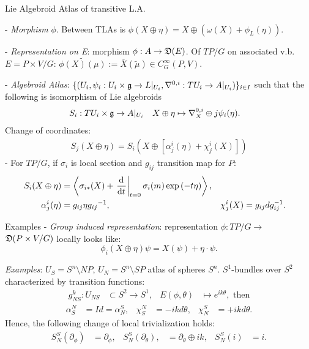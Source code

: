 \begin{frame}{Lie Algebroid Atlas of transitive L.A.}
    
    - \emph{Morphism} $\phi$. Between TLAs is $\phi(X \oplus \eta) = X \oplus (\omega(X) + \phi_L(\eta))$.
    
    - \emph{Representation on E}: morphism $\phi: A \to \alg D(E)$.
    Of $TP/G$ on associated v.b. $E = P \times V / G$: $\tilde{\phi(X)( \mu)}:= \overline{X}(\tilde{ \mu}) \in C^\infty_G(P, V).$
    
    - \emph{Algebroid Atlas}: $\{(U_i, \psi_i: U_i \times \mathfrak{g} \to L|_{U_i}, \nabla^{0, i}: TU_i \to A|_{U_i})\}_{i \in I}$ such that the following is isomorphism of Lie algebroids
    \begin{align}
        S_i: TU_i \times \mathfrak{g} &\to A|_{U_i} & X \oplus \eta &\mapsto \nabla^{0,i}_X \oplus j \psi_i(\eta).
    \end{align}
    Change of coordinates:
    \begin{align}
        S_j(X \oplus \eta) = S_i(X \oplus [\alpha^i_j(\eta) + \chi^i_j(X)])
    \end{align}
    - For $TP/G$, if $\sigma_i$ is local section and $g_{ij}$ transition map for $P$:
    \begin{align*}
        S_i(X \oplus \eta)&= \cl{\sigma_{i*}(X) + \der{t}[t = 0]\sigma_i(m) \exp{(-t \eta)}},\\
         \alpha^i_j(\eta) &= g_{ij} \eta {g_{ij}}^{-1},&
         \chi^i_j(X) &= g_{ij} dg^{-1}_{ij}.
    \end{align*}
    
\end{frame}




\begin{frame}{Examples}
    - \emph{Group induced representation}: representation $\phi:TP/G \to $ $\mathfrak{D}(P \times V/G)$ locally looks like:
    \begin{equation}
        \phi_i(X \oplus \eta) \psi = X(\psi) + \eta \cdot \psi.
    \end{equation}
    
    \textit{Examples}:
    $U_S = S^n \setminus NP$, $U_N = S^n \setminus SP$ atlas of spheres $S^n$. $S^1$-bundles over $S^2$ characterized by transition functions:
    \begin{align*}
        g^k_{NS}: U_{NS} &\subset S^2 \to S^1,&
    E(\phi, \theta) &\mapsto e^{i k \theta}, \text{   then}
    \end{align*}
    \begin{align*}
        \alpha^N_S &= Id = \alpha^S_N, & \chi^N_S &= -ikd\theta,&
     \chi^S_N &= +ik d\theta.
    \end{align*}
    Hence, the following change of local trivialization holds:
\begin{align*}
    S^S_N(\partial_\phi) &= \partial_\phi, &  S^S_N(\partial_\theta), &= \partial_\theta \oplus ik, & S^S_N(i) &= i.
\end{align*}
\end{frame}